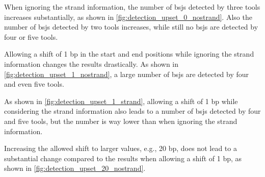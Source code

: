 When ignoring the strand information, the number of \gls{bsj}s detected by
three tools increases substantially, as shown in
\cref{fig:detection_upset_0_nostrand}.
Also the number of \gls{bsj}s detected by two tools increases, while still no
\gls{bsj}s are detected by four or five tools.

Allowing a shift of 1 bp in the start and end positions while ignoring the
strand information changes the results drastically.
As shown in \cref{fig:detection_upset_1_nostrand}, a large number of \gls{bsj}s
are detected by four and even five tools.

As shown in \cref{fig:detection_upset_1_strand}, allowing a shift of 1 bp while
considering the strand information also leads to a number of \gls{bsj}s
detected by four and five tools, but the number is way lower than when ignoring
the strand information.

Increasing the allowed shift to larger values, e.g., 20 bp, does not lead to a
substantial change compared to the results when allowing a shift of 1 bp, as
shown in \cref{fig:detection_upset_20_nostrand}.


